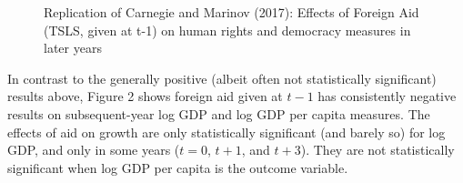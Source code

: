 \documentclass[12pt, ]{article}
\begin{document}
\begin{figure}
\begin{minipage}[t]{0.50\linewidth}
{{}

}

\end{minipage}%

\caption{\label{fig-replication}Replication of Carnegie and Marinov
(2017): Effects of Foreign Aid (TSLS, given at t-1) on human rights and
democracy measures in later years}

\end{figure}

In contrast to the generally positive (albeit often not statistically
significant) results above, Figure 2 shows foreign aid given at \(t-1\)
has consistently negative results on subsequent-year log GDP and log GDP
per capita measures. The effects of aid on growth are only statistically
significant (and barely so) for log GDP, and only in some years
(\(t=0\), \(t+1\), and \(t+3\)). They are not statistically significant
when log GDP per capita is the outcome variable.
\end{document}
